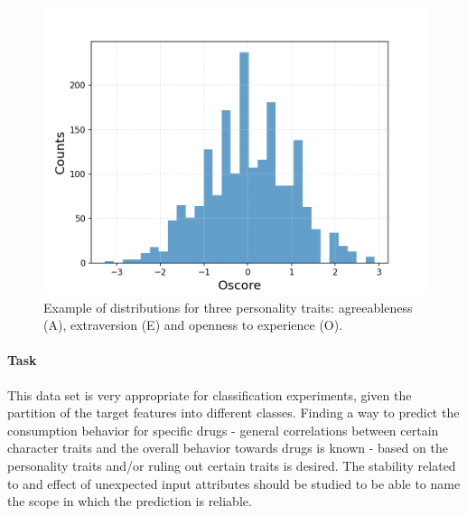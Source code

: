\documentclass{article}
\begin{document}
\begin{figure}[h!]
\begin{minipage}[b]{0.32\textwidth}
	\end{minipage}
	\begin{minipage}[b]{0.32\textwidth}
		\includegraphics[width=\textwidth]{plots/drugsPlots/Oscore.png}
	\end{minipage}
	\caption{Example of distributions for three personality traits:  agreeableness (A), extraversion (E) and openness to experience (O).}
	\label{drugs3}
\end{figure}


\clearpage
\paragraph{Task}

This data set is very appropriate for classification experiments, given the partition of the target features into different classes. Finding a way to predict the consumption behavior for specific drugs - general correlations between certain character traits and the overall behavior towards drugs is known\cite{Roncero2014NeuroticismAW}\cite{Vollrath2002WhoTH}\cite{Flory2002TheRA} - based on the personality traits and/or ruling out certain traits is desired. The stability related to and effect of unexpected input attributes should be studied to be able to name the scope in which the prediction is reliable.


\clearpage
{}

\end{document}
